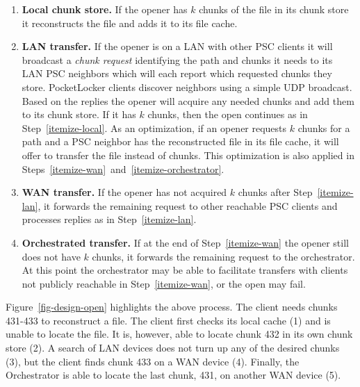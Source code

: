 \begin{enumerate}

\item \textbf{Local chunk store.} If the opener has $k$ chunks of the file in
its chunk store it reconstructs the file and adds it to its file cache.
%
\label{itemize-local}

\item \textbf{LAN transfer.} If the opener is on a LAN with other PSC clients
it will broadcast a \textit{chunk request} identifying the path and chunks it
needs to its LAN PSC neighbors which will each report which requested chunks
they store. PocketLocker clients discover neighbors using a simple UDP
broadcast. Based on the replies the opener will acquire any needed chunks and
add them to its chunk store. If it has $k$ chunks, then the open continues as
in Step~\ref{itemize-local}. As an optimization, if an opener requests $k$
chunks for a path and a PSC neighbor has the reconstructed file in its file
cache, it will offer to transfer the file instead of chunks. This
optimization is also applied in
Steps~\ref{itemize-wan}~and~\ref{itemize-orchestrator}.
%
\label{itemize-lan}

\item \textbf{WAN transfer.} If the opener has not acquired $k$ chunks after
Step~\ref{itemize-lan}, it forwards the remaining request to other reachable
PSC clients and processes replies as in Step~\ref{itemize-lan}.
%
\label{itemize-wan}

\item \textbf{Orchestrated transfer.} If at the end of Step~\ref{itemize-wan}
the opener still does not have $k$ chunks, it forwards the remaining request
to the orchestrator. At this point the orchestrator may be able to facilitate
transfers with clients not publicly reachable in Step~\ref{itemize-wan}, or
the open may fail.
%
\label{itemize-orchestrator}

\end{enumerate}

Figure~\ref{fig-design-open} highlights the above process.  The client needs
chunks 431-433 to reconstruct a file.  The client first checks its local
cache (1) and is unable to locate the file.  It is, however, able to locate
chunk 432 in its own chunk store (2).  A search of LAN devices does not turn
up any of the desired chunks (3), but the client finds chunk 433 on a WAN
device (4).  Finally, the Orchestrator is able to locate the last chunk, 431,
on another WAN device (5).


